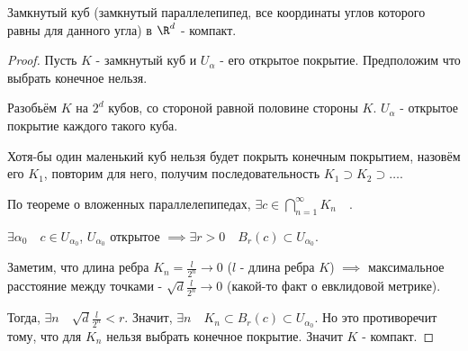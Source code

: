\begin{theorem} \thmslashn

    Замкнутый куб (замкнутый параллелепипед, все координаты углов которого равны для данного угла) в $\R^{d}$ - компакт.

    \begin{proof} \thmslashn
    
        Пусть $K$ - замкнутый куб и $U_{\alpha}$ - его открытое покрытие. Предположим что выбрать конечное нельзя.

        Разобьём $K$ на $2^{d}$ кубов, со стороной равной половине стороны $K$. $U_{\alpha}$ - открытое покрытие каждого такого куба.

        Хотя-бы один маленький куб нельзя будет покрыть конечным покрытием, назовём его $K_1$, повторим для него, получим последовательность $K_1 \supset K_2 \supset \ldots$.

        По теореме о вложенных параллелепипедах, $\exists{c\in \bigcap\limits_{n=1}^{\infty} K_{n} }\quad $. 

        $\exists{\alpha_0}\quad c\in U_{\alpha_0}$, $U_{\alpha_0}$ открытое $\implies \exists{r > 0}\quad B_{r}(c) \subset U_{\alpha_0}$.

        Заметим, что длина ребра $K_{n} = \frac{l}{2^{n}} \to 0$ ($l$ - длина ребра $K$) $\implies$ максимальное расстояние между точками - $\sqrt{d} \frac{l}{2^{n}} \to 0$ (какой-то факт о евклидовой метрике).

        Тогда, $\exists{n}\quad \sqrt{d} \frac{l}{2^{n}} < r $. Значит, $\exists{n}\quad K_{n} \subset B_{r}(c) \subset U_{\alpha_0}$. Но это противоречит тому, что для $K_{n}$ нельзя выбрать конечное покрытие. Значит $K$ - компакт.


    \end{proof}
\end{theorem}

